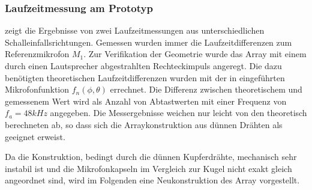 \subsubsection{Laufzeitmessung am Prototyp}
 zeigt die Ergebnisse von zwei Laufzeitmessungen aus unterschiedlichen Schalleinfallsrichtungen. Gemessen wurden immer die Laufzeitdifferenzen zum Referenzmikrofon $M_1$. Zur Verifikation der Geometrie wurde das Array mit einem durch einen Lautsprecher abgestrahlten Rechteckimpuls angeregt. Die dazu benötigten theoretischen Laufzeitdifferenzen wurden mit der in  eingeführten Mikrofonfunktion $f_n(\phi, \theta)$ errechnet. Die Differenz zwischen theoretischem und gemessenem Wert wird als Anzahl von Abtastwerten mit einer Frequenz von $f_a = 48kHz$ angegeben. Die Messergebnisse weichen nur leicht von den theoretisch berechneten ab, so dass sich die Arraykonstruktion aus dünnen Drähten als geeignet erweist.

Da die Konstruktion, bedingt durch die dünnen Kupferdrähte, mechanisch sehr instabil ist und die Mikrofonkapseln im Vergleich zur Kugel nicht exakt gleich angeordnet sind, wird im Folgenden eine Neukonstruktion des Array vorgestellt.


